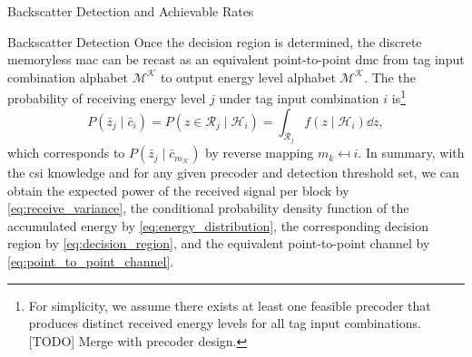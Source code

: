 \documentclass[journal]{IEEEtran}
\begin{document}
\begin{section}{Backscatter Detection and Achievable Rates}
\begin{subsection}{Backscatter Detection}
			Once the decision region is determined, the discrete memoryless \gls{mac} can be recast as an equivalent point-to-point \gls{dmc} from tag input combination alphabet $\mathcal{M^K}$ to output energy level alphabet $\mathcal{M^K}$. The the probability of receiving energy level $j$ under tag input combination $i$ is\footnote{For simplicity, we assume there exists at least one feasible precoder that produces distinct received energy levels for all tag input combinations. [TODO] Merge with precoder design.}
			\begin{equation}
				P(\bar{z}_j \mid \bar{c}_i) = P(z \in \mathcal{R}_j \mid \mathcal{H}_i) = \int_{\mathcal{R}_j} f(z \mid \mathcal{H}_i) \dd z,
				\label{eq:point_to_point_channel}
			\end{equation}
			which corresponds to $P(\bar{z}_j \mid \bar{c}_{m_{\mathcal{K}}})$ by reverse mapping $m_k \mapsfrom i$. In summary, with the \gls{csi} knowledge and for any given precoder and detection threshold set, we can obtain the expected power of the received signal per block by \eqref{eq:receive_variance}, the conditional probability density function of the accumulated energy by \eqref{eq:energy_distribution}, the corresponding decision region by \eqref{eq:decision_region}, and the equivalent point-to-point channel by \eqref{eq:point_to_point_channel}.
		\end{subsection}


\end{section}
\end{document}
